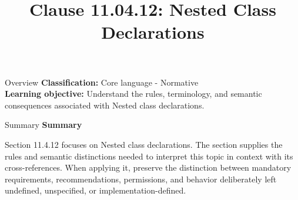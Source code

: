 \documentclass[10pt,letterpaper]{article}
\title{Clause 11.04.12: Nested Class Declarations}
\author{}
\date{}
\begin{document}
\maketitle
\begin{CornellOverviewBox}{Overview}
\textbf{Classification:} Core language - Normative\\[2pt]
\textbf{Learning objective:} Understand the rules, terminology, and semantic consequences associated with Nested class declarations.
\end{CornellOverviewBox}\begin{CornellSummaryBox}{Summary}
{\sffamily\bfseries\color{Accent} Summary}\par\vspace{3pt}Section 11.4.12 focuses on Nested class declarations. The section supplies the rules and semantic distinctions needed to interpret this topic in context with its cross-references. When applying it, preserve the distinction between mandatory requirements, recommendations, permissions, and behavior deliberately left undefined, unspecified, or implementation-defined.
\end{CornellSummaryBox}
\end{document}
